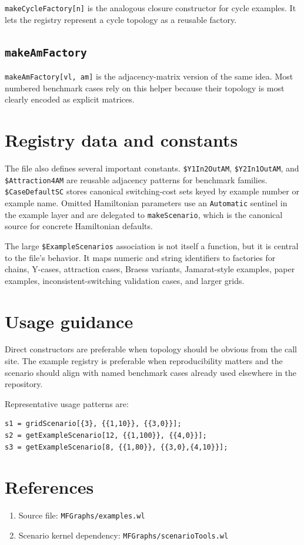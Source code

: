 \documentclass[11pt]{article}
\begin{document}
\texttt{makeCycleFactory[n]} is the analogous closure constructor for cycle examples. It lets the registry represent a cycle topology as a reusable factory.

\subsection*{\texttt{makeAmFactory}}

\texttt{makeAmFactory[vl, am]} is the adjacency-matrix version of the same idea. Most numbered benchmark cases rely on this helper because their topology is most clearly encoded as explicit matrices.

\section{Registry data and constants}

The file also defines several important constants. \texttt{\$Y1In2OutAM}, \texttt{\$Y2In1OutAM}, and \texttt{\$Attraction4AM} are reusable adjacency patterns for benchmark families. \texttt{\$CaseDefaultSC} stores canonical switching-cost sets keyed by example number or example name. Omitted Hamiltonian parameters use an \texttt{Automatic} sentinel in the example layer and are delegated to \texttt{makeScenario}, which is the canonical source for concrete Hamiltonian defaults.

The large \texttt{\$ExampleScenarios} association is not itself a function, but it is central to the file's behavior. It maps numeric and string identifiers to factories for chains, Y-cases, attraction cases, Braess variants, Jamarat-style examples, paper examples, inconsistent-switching validation cases, and larger grids.

\section{Usage guidance}

Direct constructors are preferable when topology should be obvious from the call site. The example registry is preferable when reproducibility matters and the scenario should align with named benchmark cases already used elsewhere in the repository.

Representative usage patterns are:

\begin{verbatim}
s1 = gridScenario[{3}, {{1,10}}, {{3,0}}];
s2 = getExampleScenario[12, {{1,100}}, {{4,0}}];
s3 = getExampleScenario[8, {{1,80}}, {{3,0},{4,10}}];
\end{verbatim}

\section*{References}

\begin{enumerate}
\item Source file: \texttt{MFGraphs/examples.wl}
\item Scenario kernel dependency: \texttt{MFGraphs/scenarioTools.wl}
\end{enumerate}
\end{document}
